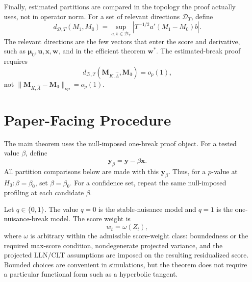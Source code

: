 \documentclass[12pt]{article}
\numberwithin{equation}{section}
\theoremstyle{definition}
\begin{document}
Finally, estimated partitions are compared in the topology the proof actually
uses, not in operator norm. For a set of relevant directions \(\mathcal D_T\),
define
\[
    d_{\mathcal D,T}(M_1,M_0)
    =\sup_{a,b\in\mathcal D_T}
      \left|T^{-1/2}a'(M_1-M_0)b\right|.
\]
The relevant directions are the few vectors that enter the score and derivative,
such as \(\bm\mu_0,\bm u,\bm x,\bm w\), and in the efficient theorem
\(\bm w^*\). The estimated-break proof requires
\[
    d_{\mathcal D,T}(\bm M_{K,\widehat\Lambda},\bm M_0)=o_p(1),
\]
not \(\|\bm M_{K,\widehat\Lambda}-\bm M_0\|_{op}=o_p(1)\).




\section{Paper-Facing Procedure}

The main theorem uses the null-imposed one-break proof object. For a tested
value \(\beta\), define
\[
    \bm y_\beta=\bm y-\beta\bm x.
\]
All partition comparisons below are made with this \(\bm y_\beta\). Thus, for a
\(p\)-value at \(H_0:\beta=\beta_0\), set \(\beta=\beta_0\). For a confidence
set, repeat the same null-imposed profiling at each candidate \(\beta\).

Let \(q\in\{0,1\}\). The value \(q=0\) is the stable-nuisance model and
\(q=1\) is the one-nuisance-break model. The score weight is
\[
    w_t=\omega(Z_t),
\]
where \(\omega\) is arbitrary within the admissible score-weight class:
boundedness or the required max-score condition, nondegenerate projected
variance, and the projected LLN/CLT assumptions are imposed on the resulting
residualized score. Bounded choices are convenient in simulations, but the
theorem does not require a particular functional form such as a hyperbolic
tangent.
\end{document}
